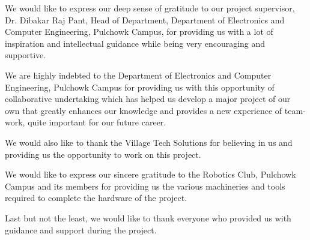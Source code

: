 	\vspace{0.5cm}	

We would like to express our deep sense of gratitude to our project supervisor, Dr. Dibakar Raj Pant, Head of Department, Department of Electronics and Computer Engineering, Pulchowk Campus, for providing us with a lot of inspiration and intellectual guidance while being very encouraging and supportive.

We are highly indebted to the Department of Electronics and Computer Engineering, Pulchowk Campus for providing us with this opportunity of collaborative undertaking which has helped us develop a major project of our own that greatly enhances our knowledge and provides a new experience of team-work, quite important for our future career.

We would also like to thank the Village Tech Solutions for believing in us and providing us the opportunity to work on this project.

We would like to express our sincere gratitude to the Robotics Club, Pulchowk Campus and its members for providing us the various machineries and tools required to complete the hardware of the project.

Last but not the least, we would like to thank everyone who provided us with guidance and support during the project.
